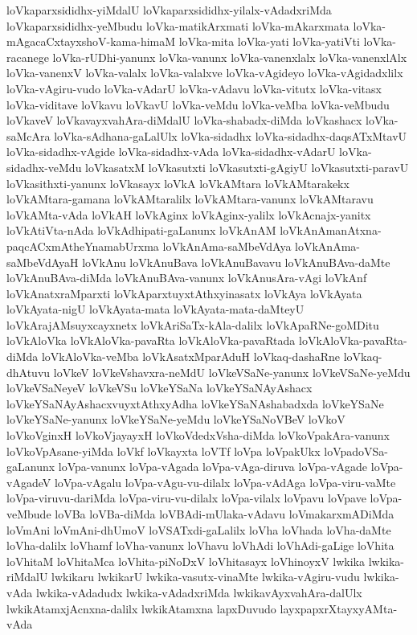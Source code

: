 {loVkaparxsididhx-yiMdalU
loVkaparxsididhx-yilalx-vAdadxriMda
loVkaparxsididhx-yeMbudu
loVka-matikArxmati
loVka-mAkarxmata
loVka-mAgacaCxtayxshoV-kama-himaM
loVka-mita
loVka-yati
loVka-yatiVti
loVka-racanege
loVka-rUDhi-yanunx
loVka-vanunx
loVka-vanenxlalx
loVka-vanenxlAlx
loVka-vanenxV
loVka-valalx
loVka-valalxve
loVka-vAgideyo
loVka-vAgidadxlilx
loVka-vAgiru-vudo
loVka-vAdarU
loVka-vAdavu
loVka-vitutx
loVka-vitasx
loVka-viditave
loVkavu
loVkavU
loVka-veMdu
loVka-veMba
loVka-veMbudu
loVkaveV
loVkavayxvahAra-diMdalU
loVka-shabadx-diMda
loVkashacx
loVka-saMcAra
loVka-sAdhana-gaLalUlx
loVka-sidadhx
loVka-sidadhx-daqsATxMtavU
loVka-sidadhx-vAgide
loVka-sidadhx-vAda
loVka-sidadhx-vAdarU
loVka-sidadhx-veMdu
loVkasatxM
loVkasutxti
loVkasutxti-gAgiyU
loVkasutxti-paravU
loVkasithxti-yanunx
loVkasayx
loVkA
loVkAMtara
loVkAMtarakekx
loVkAMtara-gamana
loVkAMtaralilx
loVkAMtara-vanunx
loVkAMtaravu
loVkAMta-vAda
loVkAH
loVkAginx
loVkAginx-yalilx
loVkAcnajx-yanitx
loVkAtiVta-nAda
loVkAdhipati-gaLanunx
loVkAnAM
loVkAnAmanAtxna-paqcACxmAtheYnamabUrxma
loVkAnAma-saMbeVdAya
loVkAnAma-saMbeVdAyaH
loVkAnu
loVkAnuBava
loVkAnuBavavu
loVkAnuBAva-daMte
loVkAnuBAva-diMda
loVkAnuBAva-vanunx
loVkAnusAra-vAgi
loVkAnf
loVkAnatxraMparxti
loVkAparxtuyxtAthxyinasatx
loVkAya
loVkAyata
loVkAyata-nigU
loVkAyata-mata
loVkAyata-mata-daMteyU
loVkArajAMsuyxcayxnetx
loVkAriSaTx-kAla-dalilx
loVkApaRNe-goMDitu
loVkAloVka
loVkAloVka-pavaRta
loVkAloVka-pavaRtada
loVkAloVka-pavaRta-diMda
loVkAloVka-veMba
loVkAsatxMparAduH
loVkaq-dashaRne
loVkaq-dhAtuvu
loVkeV
loVkeVshavxra-neMdU
loVkeVSaNe-yanunx
loVkeVSaNe-yeMdu
loVkeVSaNeyeV
loVkeVSu
loVkeYSaNa
loVkeYSaNAyAshacx
loVkeYSaNAyAshacxvuyxtAthxyAdha
loVkeYSaNAshabadxda
loVkeYSaNe
loVkeYSaNe-yanunx
loVkeYSaNe-yeMdu
loVkeYSaNoVBeV
loVkoV
loVkoVginxH
loVkoVjayayxH
loVkoVdedxVsha-diMda
loVkoVpakAra-vanunx
loVkoVpAsane-yiMda
loVkf
loVkayxta
loVTf
loVpa
loVpakUkx
loVpadoVSa-gaLanunx
loVpa-vanunx
loVpa-vAgada
loVpa-vAga-diruva
loVpa-vAgade
loVpa-vAgadeV
loVpa-vAgalu
loVpa-vAgu-vu-dilalx
loVpa-vAdAga
loVpa-viru-vaMte
loVpa-viruvu-dariMda
loVpa-viru-vu-dilalx
loVpa-vilalx
loVpavu
loVpave
loVpa-veMbude
loVBa
loVBa-diMda
loVBAdi-mUlaka-vAdavu
loVmakarxmADiMda
loVmAni
loVmAni-dhUmoV
loVSATxdi-gaLalilx
loVha
loVhada
loVha-daMte
loVha-dalilx
loVhamf
loVha-vanunx
loVhavu
loVhAdi
loVhAdi-gaLige
loVhita
loVhitaM
loVhitaMca
loVhita-piNoDxV
loVhitasayx
loVhinoyxV
lwkika
lwkika-riMdalU
lwkikaru
lwkikarU
lwkika-vasutx-vinaMte
lwkika-vAgiru-vudu
lwkika-vAda
lwkika-vAdadudx
lwkika-vAdadxriMda
lwkikavAyxvahAra-dalUlx
lwkikAtamxjAcnxna-dalilx
lwkikAtamxna
lapxDuvudo
layxpapxrXtayxyAMta-vAda
}
